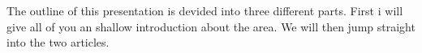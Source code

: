 The outline of this presentation is devided into three different parts. First i will give all of you an shallow introduction about the area. We will then jump straight into the two articles.